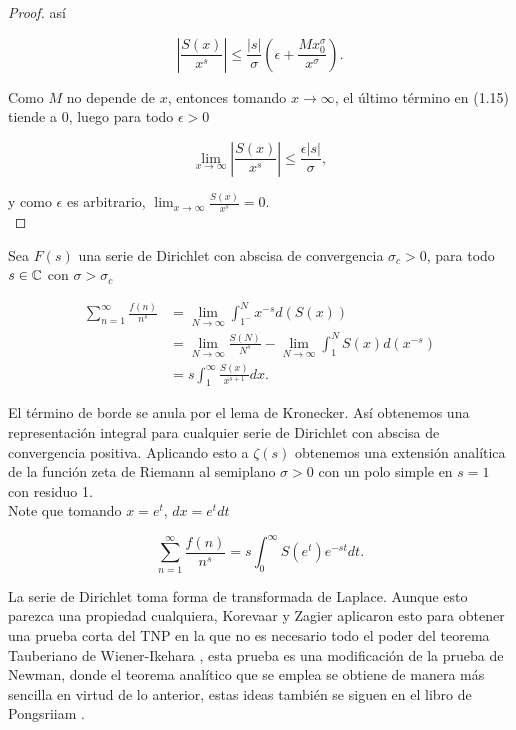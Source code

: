 \begin{proof}
así

\begin{equation}
\left|\frac{S(x)}{x^s}\right| \leq \frac{|s|}{\sigma}\left(\epsilon+\frac{M x_0^{\sigma}}{x^{\sigma}}\right).
\end{equation}

Como $M$ no depende de $x$, entonces tomando $x\to\infty$, el último término en (1.15) tiende a 0, luego para todo $\epsilon>0$

$$\lim_{x \to \infty}\left|\frac{S(x)}{x^s}\right|\leq \frac{\epsilon|s|}{\sigma},$$

y como $\epsilon$ es arbitrario, $\displaystyle\lim_{x \to \infty} \frac{S(x)}{x^s}=0$.\\
\end{proof}

Sea $F(s)$ una serie de Dirichlet con abscisa de convergencia $\sigma_c>0$, para todo $s\in \mathbb{C}$ con $\sigma>\sigma_c$

\begin{align*}
\sum_{n=1}^{\infty}\frac{f(n)}{n^s}&=\lim_{N \to \infty} \int_{1^{-}}^N x^{-s}d(S(x))\\
&=\lim_{N \to \infty}\frac{S(N)}{N^s}-\lim_{N \to \infty} \int_1^N S(x)d(x^{-s})\\
&=s\int_1^{\infty} \frac{S(x)}{x^{s+1}}dx.
\end{align*}

El término de borde se anula por el lema de Kronecker. Así obtenemos una representación integral para cualquier serie de Dirichlet con abscisa de convergencia positiva. Aplicando esto a $\zeta(s)$  obtenemos una extensión analítica de la función zeta de Riemann al semiplano $\sigma>0$ con un polo simple en $s=1$ con residuo 1.\\

Note que tomando $x=e^t$, $dx=e^tdt$

$$\sum_{n=1}^{\infty} \frac{f(n)}{n^s}=s\int_0^{\infty}S(e^{t})e^{-st}dt.$$

La serie de Dirichlet toma forma de transformada de Laplace. Aunque esto parezca una propiedad cualquiera, Korevaar y Zagier aplicaron esto para obtener una prueba corta del TNP en la que no es necesario todo el poder del teorema Tauberiano de Wiener-Ikehara \cite{zagier1997newman}, esta prueba es una modificación de la prueba de Newman, donde el teorema analítico que se emplea se obtiene de manera más sencilla en virtud de lo anterior, estas ideas también se siguen en el libro de Pongsriiam \cite{pongsriiam2023analytic}.

